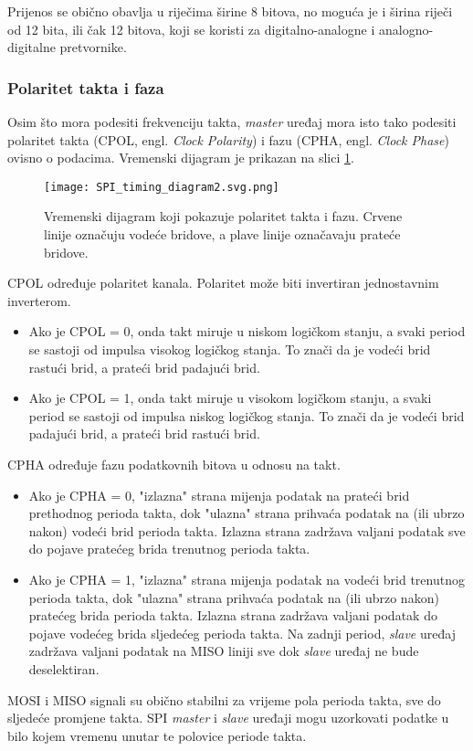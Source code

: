 Prijenos se obično obavlja u riječima širine 8 bitova, no moguća je i širina riječi od 12 bita, ili čak 12 bitova, koji se koristi za digitalno-analogne i analogno-digitalne pretvornike.

\subsubsection{Polaritet takta i faza}

Osim što mora podesiti frekvenciju takta, \textit{master} uređaj mora isto tako podesiti polaritet takta (CPOL, engl. \textit{Clock Polarity}) i fazu (CPHA, engl. \textit{Clock Phase}) ovisno o podacima. Vremenski dijagram je prikazan na slici \ref{fig:spi_timing_diagram}.
\begin{figure}[H]
	\centering
	\texttt{[image: SPI\_timing\_diagram2.svg.png]}
	\caption{Vremenski dijagram koji pokazuje polaritet takta i fazu. Crvene linije označuju vodeće bridove, a plave linije označavaju prateće bridove.}
	\label{fig:spi_timing_diagram}
\end{figure}
CPOL određuje polaritet kanala. Polaritet može biti invertiran jednostavnim inverterom.
\begin{itemize}
	\item Ako je CPOL = 0, onda takt miruje u niskom logičkom stanju, a svaki period se sastoji od impulsa visokog logičkog stanja. To znači da je vodeći brid rastući brid, a prateći brid padajući brid.
	\item Ako je CPOL = 1, onda takt miruje u visokom logičkom stanju, a svaki period se sastoji od impulsa niskog logičkog stanja. To znači da je vodeći brid padajući brid, a prateći brid rastući brid.
\end{itemize}
CPHA određuje fazu podatkovnih bitova u odnosu na takt.
\begin{itemize}
	\item Ako je CPHA = 0, "izlazna" strana mijenja podatak na prateći brid prethodnog perioda takta, dok "ulazna" strana prihvaća podatak na (ili ubrzo nakon) vodeći brid perioda takta. Izlazna strana zadržava valjani podatak sve do pojave pratećeg brida trenutnog perioda takta.
	\item Ako je CPHA = 1, "izlazna" strana mijenja podatak na vodeći brid trenutnog perioda takta, dok "ulazna" strana prihvaća podatak na (ili ubrzo nakon) pratećeg brida perioda takta. Izlazna strana zadržava valjani podatak do pojave vodećeg brida sljedećeg perioda takta. Na zadnji period, \textit{slave} uređaj zadržava valjani podatak na MISO liniji sve dok \textit{slave} uređaj ne bude deselektiran.
\end{itemize}
MOSI i MISO signali su obično stabilni za vrijeme pola perioda takta, sve do sljedeće promjene takta. SPI \textit{master} i \textit{slave} uređaji mogu uzorkovati podatke u bilo kojem vremenu unutar te polovice periode takta.

